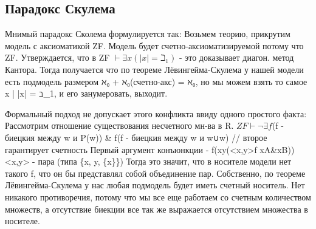 \subsection{Парадокс Скулема}
\label{sec-17-4}
Мнимый парадокс Сколема формулируется так:
Возьмем теорию, прикрутим модель с аксиоматикой ZF. Модель
будет счетно-аксиоматизируемой потому что ZF.
Утверждается, что в ZF $\vdash \exists x(|x| = ℶ_1)$ - это доказывает диагон.
метод Кантора.
Тогда получается что по теореме Лёвингейма-Скулема у нашей
модели есть подмодель размером ℵ₀ + ℵ₀(счетно-акс) = ℵ₀, но
мы можем взять то самое x | |x| = ℶ_1, и его занумеровать, выходит.

Формальный подход не допускает этого конфликта ввиду одного
простого факта:
Рассмотрим отношение существования несчетного мн-ва в R.
$ZF \vdash \lnot \exists f$(f - биецкия между w и P(w)) \& \exists f(f - биецкия между w и w∪w)
// второе гарантирует счетность
Первый аргумент конъюнкции - \lnot \exists f(\forall x\forall y(<x,y>\in f \leftrightarrow x\in A\&x\in B))
<x,y> - пара (типа \{x, y, \{x\}\})
Тогда это значит, что в носителе модели нет такого f, что он
бы представлял собой объединение пар.
Собственно, по теореме Лёвингейма-Скулема у нас любая подмодель
будет иметь счетный носитель. Нет никакого противоречия, потому
что мы все еще работаем со счетным количеством множеств, а
отсутствие биекции все так же выражается отсутствием множества
в носителе.

